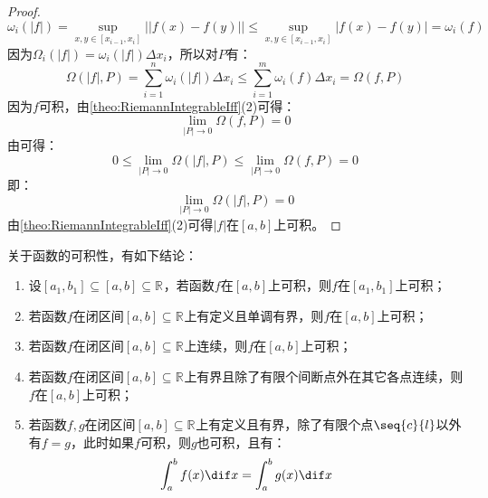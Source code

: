 \begin{proof}
\begin{equation*}
		\omega_i(|f|)=\sup_{x,y\in[x_{i-1},x_i]}\Big||f(x)-f(y)|\Big|\leqslant\sup_{x,y\in[x_{i-1},x_i]}|f(x)-f(y)|=\omega_i(f)
	\end{equation*}
	因为$\Omega_i(|f|)=\omega_i(|f|)\Delta x_i$，所以对$P$有：
	\begin{equation*}
		\Omega(|f|,P)=\sum_{i=1}^{n}\omega_i(|f|)\Delta x_i\leqslant\sum_{i=1}^{m}\omega_i(f)\Delta x_i=\Omega(f,P)
	\end{equation*}
	因为$f$可积，由\cref{theo:RiemannIntegrableIff}(2)可得：
	\begin{equation*}
		\lim_{|P|\to0}\Omega(f,P)=0
	\end{equation*}
	由可得：
	\begin{equation*}
		0\leqslant\lim_{|P|\to0}\Omega(|f|,P)\leqslant\lim_{|P|\to0}\Omega(f,P)=0
	\end{equation*}
	即：
	\begin{equation*}
		\lim_{|P|\to0}\Omega\left(|f|,P\right)=0
	\end{equation*}
	由\cref{theo:RiemannIntegrableIff}(2)可得$|f|$在$[a,b]$上可积。
\end{proof}
\begin{theorem}\label{theo:RiemannIntegrable}
	关于函数的可积性，有如下结论：
	\begin{enumerate}
		\item 设$[a_1,b_1]\subseteq[a,b]\subseteq\mathbb{R}^{}$，若函数$f$在$[a,b]$上可积，则$f$在$[a_1,b_1]$上可积；
		\item 若函数$f$在闭区间$[a,b]\subseteq\mathbb{R}^{}$上有定义且单调有界，则$f$在$[a,b]$上可积；
		\item 若函数$f$在闭区间$[a,b]\subseteq\mathbb{R}^{}$上连续，则$f$在$[a,b]$上可积；
		\item 若函数$f$在闭区间$[a,b]\subseteq\mathbb{R}^{}$上有界且除了有限个间断点外在其它各点连续，则$f$在$[a,b]$上可积；
		\item 若函数$f,g$在闭区间$[a,b]\subseteq\mathbb{R}^{}$上有定义且有界，除了有限个点$\seq{c}{l}$以外有$f=g$，此时如果$f$可积，则$g$也可积，且有：
		\begin{equation*}
			\int_{a}^bf(x)\dif x=\int_{a}^bg(x)\dif x
		\end{equation*}
	\end{enumerate}
\end{theorem}
